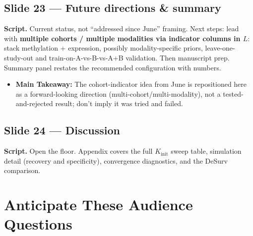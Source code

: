 \documentclass[11pt]{article}
\newcommand{\scriptlabel}{\textbf{Script. }}
\newcommand{\sectionlabel}[1]{\textbf{#1}}
\newcommand{\key}[1]{\textcolor{keyblue}{\textbf{#1}}}        %
\begin{document}
\subsection*{Slide 23 --- Future directions \& summary}
\scriptlabel Current status, not ``addressed since June'' framing. Next steps: lead with \key{multiple
cohorts / multiple modalities via indicator columns in $L$}: stack methylation + expression, possibly
modality-specific priors, leave-one-study-out and train-on-A-vs-B-vs-A+B validation. Then manuscript
prep. Summary panel restates the recommended configuration with numbers.

\begin{itemize}
\item \sectionlabel{Main Takeaway:} The cohort-indicator idea from June is repositioned here as a
forward-looking direction (multi-cohort/multi-modality), not a tested-and-rejected result; don't
imply it was tried and failed.
\end{itemize}

\subsection*{Slide 24 --- Discussion}
\scriptlabel Open the floor. Appendix covers the full $K_\text{init}$ sweep table, simulation detail
(recovery and specificity), convergence diagnostics, and the DeSurv comparison.

\section*{Anticipate These Audience Questions}
\end{document}
